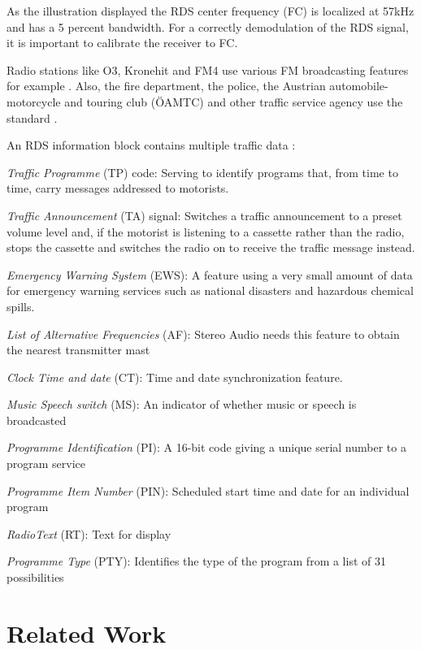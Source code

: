 \documentclass[conference,12pt,a4paper]{IEEEtran}
\begin{document}
	As the illustration displayed the RDS center frequency (FC) is localized at 57kHz and has a 5 percent bandwidth. For a correctly demodulation of the RDS signal, it is important to calibrate the receiver to FC.
	
	Radio stations like O3, Kronehit and FM4 use various FM broadcasting features for example \cite{Stau}. Also, the fire department, the police, the Austrian automobile- motorcycle and touring club (ÖAMTC) and other traffic service agency use the standard \cite{standard}.
	
	An RDS information block contains multiple traffic data \cite{Dietman}: 
	
	\textit{Traffic Programme} (TP) code: Serving to identify programs that, from time to time, carry messages addressed to motorists.
	
	\textit{Traffic Announcement} (TA) signal: Switches a traffic announcement to a preset volume level and, if the motorist is listening to a cassette rather than the radio, stops the cassette and switches the radio on to receive the traffic message instead.
	
	\textit{Emergency Warning System} (EWS): A feature using a very small amount of data for emergency warning services such as national disasters and hazardous chemical spills.
	
	\textit{List of Alternative Frequencies} (AF): Stereo Audio needs this feature to obtain the nearest transmitter mast
	
	\textit{Clock Time and date} (CT): Time and date synchronization feature.
	
	\textit{Music Speech switch} (MS): An indicator of whether music or speech is broadcasted
	
	\textit{Programme Identification} (PI): A 16-bit code giving a unique serial number to a program service
	
	\textit{Programme Item Number} (PIN): Scheduled start time and date for an individual program
	
	\textit{RadioText}  (RT): Text for display
	
	\textit{Programme Type} (PTY): Identifies the type of the program from a list of 31 possibilities
	\\
	
	

	\section{Related Work}
	
\end{document}
